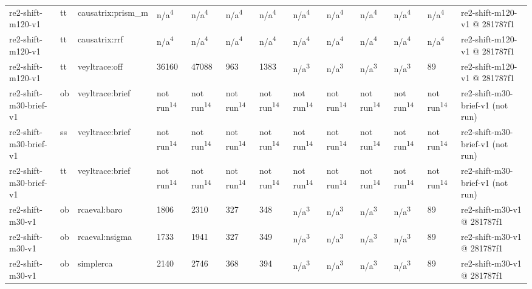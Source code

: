 \begin{table}[t]
\begin{tabular}{lllllllllllll}
re2-shift-m120-v1 & tt & causatrix:prism\_m & n/a\textsuperscript{4} & n/a\textsuperscript{4} & n/a\textsuperscript{4} & n/a\textsuperscript{4} & n/a\textsuperscript{4} & n/a\textsuperscript{4} & n/a\textsuperscript{4} & n/a\textsuperscript{4} & n/a\textsuperscript{4} & re2-shift-m120-v1 @ 281787f1 \\
re2-shift-m120-v1 & tt & causatrix:rrf & n/a\textsuperscript{4} & n/a\textsuperscript{4} & n/a\textsuperscript{4} & n/a\textsuperscript{4} & n/a\textsuperscript{4} & n/a\textsuperscript{4} & n/a\textsuperscript{4} & n/a\textsuperscript{4} & n/a\textsuperscript{4} & re2-shift-m120-v1 @ 281787f1 \\
re2-shift-m120-v1 & tt & veyltrace:off & 36160 & 47088 & 963 & 1383 & n/a\textsuperscript{3} & n/a\textsuperscript{3} & n/a\textsuperscript{3} & n/a\textsuperscript{3} & 89 & re2-shift-m120-v1 @ 281787f1 \\
re2-shift-m30-brief-v1 & ob & veyltrace:brief & not run\textsuperscript{14} & not run\textsuperscript{14} & not run\textsuperscript{14} & not run\textsuperscript{14} & not run\textsuperscript{14} & not run\textsuperscript{14} & not run\textsuperscript{14} & not run\textsuperscript{14} & not run\textsuperscript{14} & re2-shift-m30-brief-v1 (not run) \\
re2-shift-m30-brief-v1 & ss & veyltrace:brief & not run\textsuperscript{14} & not run\textsuperscript{14} & not run\textsuperscript{14} & not run\textsuperscript{14} & not run\textsuperscript{14} & not run\textsuperscript{14} & not run\textsuperscript{14} & not run\textsuperscript{14} & not run\textsuperscript{14} & re2-shift-m30-brief-v1 (not run) \\
re2-shift-m30-brief-v1 & tt & veyltrace:brief & not run\textsuperscript{14} & not run\textsuperscript{14} & not run\textsuperscript{14} & not run\textsuperscript{14} & not run\textsuperscript{14} & not run\textsuperscript{14} & not run\textsuperscript{14} & not run\textsuperscript{14} & not run\textsuperscript{14} & re2-shift-m30-brief-v1 (not run) \\
re2-shift-m30-v1 & ob & rcaeval:baro & 1806 & 2310 & 327 & 348 & n/a\textsuperscript{3} & n/a\textsuperscript{3} & n/a\textsuperscript{3} & n/a\textsuperscript{3} & 89 & re2-shift-m30-v1 @ 281787f1 \\
re2-shift-m30-v1 & ob & rcaeval:nsigma & 1733 & 1941 & 327 & 349 & n/a\textsuperscript{3} & n/a\textsuperscript{3} & n/a\textsuperscript{3} & n/a\textsuperscript{3} & 89 & re2-shift-m30-v1 @ 281787f1 \\
re2-shift-m30-v1 & ob & simplerca & 2140 & 2746 & 368 & 394 & n/a\textsuperscript{3} & n/a\textsuperscript{3} & n/a\textsuperscript{3} & n/a\textsuperscript{3} & 89 & re2-shift-m30-v1 @ 281787f1 \\

\end{tabular}
\end{table}
